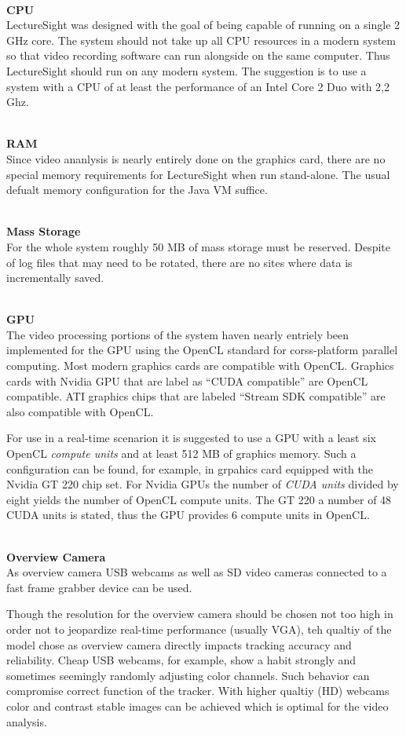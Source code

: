 \documentclass[a4paper,10pt]{book}
\begin{document}
~\\\noindent\textbf{CPU}\\
\noindent LectureSight was designed with the goal of being capable of running on a single 2 GHz core. The system should not take up all CPU resources in a modern system so that video recording software can run alongside on the same computer. Thus LectureSight should run on any modern system. The suggestion is to use a system with a CPU of at least the performance of an Intel Core 2 Duo with 2,2 Ghz.

~\\\noindent\textbf{RAM}\\
\noindent Since video ananlysis is nearly entirely done on the graphics card, there are no special memory requirements for LectureSight when run stand-alone. The usual defualt memory configuration for the Java VM suffice.  

~\\\noindent\textbf{Mass Storage}\\
\noindent For the whole system roughly 50 MB of mass storage must be reserved. Despite of log files that may need to be rotated, there are no sites where data is incrementally saved.

~\\\noindent\textbf{GPU}\\
The video processing portions of the system haven nearly entriely been implemented for the GPU using the OpenCL standard for corss-platform parallel computing. Most modern graphics cards are compatible with OpenCL. Graphics cards with Nvidia GPU that are label as ``CUDA compatible'' are OpenCL compatible. ATI graphics chips that are labeled ``Stream SDK compatible'' are also compatible with OpenCL.

For use in a real-time scenarion it is suggested to use a GPU with a least six OpenCL \textit{compute units} and at least 512 MB of graphics memory. Such a configuration can be found, for example, in grpahics card equipped with the Nvidia GT 220 chip set. For Nvidia GPUs the number of \textit{CUDA units} divided by eight yields the number of OpenCL compute units. The GT 220 a number of 48 CUDA units is stated, thus the GPU provides 6 compute units in OpenCL.

~\\\noindent\textbf{Overview Camera}\\
As overview camera USB webcams as well as SD video cameras connected to a fast frame grabber device can be used. 

Though the resolution for the overview camera should be chosen not too high in order not to jeopardize real-time performance (usually VGA), teh qualtiy of the model chose as overview camera directly impacts tracking accuracy and reliability. Cheap USB webcams, for example, show a habit strongly and sometimes seemingly randomly adjusting color channels. Such behavior can compromise correct function of the tracker. With higher qualtiy (HD) webcams color and contrast stable images can be achieved which is optimal for the video analysis. 
\end{document}
